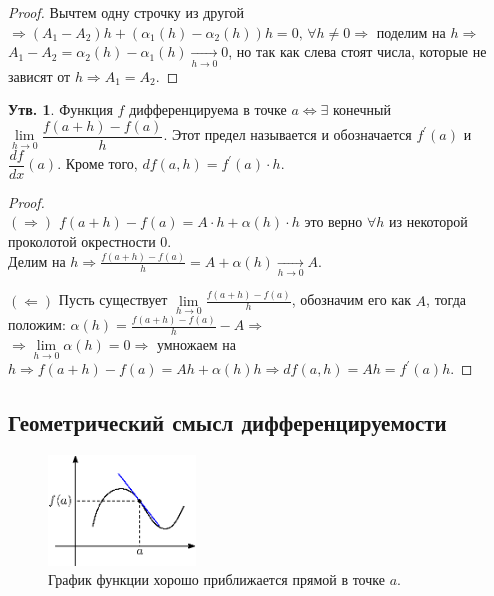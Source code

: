 \documentclass[12pt]{article}
\theoremstyle{definition}
\newtheorem{prop}{Утв.}
\begin{document}
\begin{proof}
	Вычтем одну строчку из другой $\Rightarrow (A_1 - A_2)h + (\alpha_1(h) - \alpha_2(h))h = 0, \, \forall h \neq 0 \Rightarrow$ поделим на $h \Rightarrow$\\
	$A_1 - A_2 = \alpha_2(h) - \alpha_1(h) \xrightarrow[h \to 0]{}0$, но так как слева стоят числа, которые не зависят от $h \Rightarrow A_1 = A_2$.  
\end{proof}

\begin{prop}
	Функция $f$ дифференцируема в точке $a \Leftrightarrow \exists$ конечный $\lim\limits_{h \to 0}\dfrac{f(a+h) - f(a)}{h}$. Этот предел называется  и обозначается $f^\prime(a)$ и $\dfrac{df}{dx}(a)$. Кроме того, $df(a,h) = f^\prime(a){\cdot}h$.
\end{prop}

\begin{proof}\hfill\\
	$(\Rightarrow)$ $f(a+h) - f(a) = A{\cdot}h + \alpha(h){\cdot}h$ это верно $\forall h$ из некоторой проколотой окрестности $0$. \\
	Делим на $h \Rightarrow \tfrac{f(a+h) - f(a)}{h} = A + \alpha(h) \xrightarrow[h \to 0]{} A$.
	
	$(\Leftarrow)$ Пусть существует $\lim\limits_{h \to 0}\tfrac{f(a+h) - f(a)}{h}$, обозначим его как $A$, тогда положим: $\alpha(h) = \tfrac{f(a + h) - f(a)}{h} - A \Rightarrow$\\
	$\Rightarrow \lim\limits_{h \to 0} \alpha(h) = 0 \Rightarrow$ умножаем на $h \Rightarrow f(a+h) - f(a)  = Ah + \alpha(h)h  \Rightarrow df(a,h) = Ah = f^\prime(a)h$.
\end{proof}

\subsection*{Геометрический смысл дифференцируемости}

\begin{figure}[H]
	\centering
	\includegraphics[width=0.35\textwidth]{21_2.eps}
	\caption{График функции хорошо приближается прямой в точке $a$.}
	\label{21_2}
\end{figure}
\end{document}
